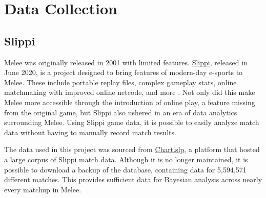 \chapter{Data Collection}
\newpage

\section{Slippi}
Melee was originally released in 2001 with limited features. \href{https://slippi.gg/about}{Slippi}, released in June 2020, is a project designed to bring features of modern-day e-sports to Melee. These include portable replay files, complex gameplay stats, online matchmaking with improved online netcode, and more \citep{Slippi}. Not only did this make Melee more accessible through the introduction of online play, a feature missing from the original game, but Slippi also ushered in an era of data analytics surrounding Melee. Using Slippi game data, it is possible to easily analyze match data without having to manually record match results.

\indent The data used in this project was sourced from \href{https://chartslp.com/}{Chart.slp}, a platform that hosted a large corpus of Slippi match data. Although it is no longer maintained, it is possible to download a backup of the database, containing data for 5,594,571 different matches. This provides sufficient data for Bayesian analysis across nearly every matchup in Melee.